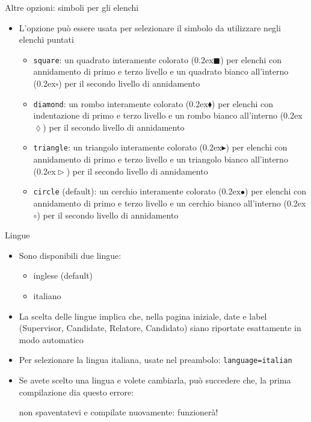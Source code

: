 \begin{frame}[t,fragile]{Altre opzioni: simboli per gli elenchi}
\begin{itemize}
\item L'opzione  può essere usata per selezionare il simbolo da utilizzare negli elenchi puntati
  \begin{itemize}
  \item \verb!square!: un quadrato interamente colorato
        ({\tiny\raise0.2ex\hbox{$\blacksquare$}}) per elenchi con annidamento di primo e terzo livello e un quadrato bianco all'interno
        ({\tiny\raise0.2ex\hbox{$\square$}}) per il secondo livello di annidamento
  \item \verb!diamond!: un rombo interamente colorato
        ({\tiny\raise0.2ex\hbox{$\blacklozenge$}}) per elenchi con indentazione di primo e terzo livello e un rombo bianco all'interno
        ({\tiny\raise0.2ex\hbox{$\lozenge$}}) per il secondo livello di annidamento
  \item \verb!triangle!: un triangolo interamente colorato
        ({\tiny\raise0.2ex\hbox{$\blacktriangleright$}}) per elenchi con annidamento di primo e terzo livello e un triangolo bianco all'interno
        ({\tiny\raise0.2ex\hbox{$\vartriangleright$}}) per il secondo livello di annidamento
  \item \verb!circle! (default): un cerchio interamente colorato
        ({\tiny\raise0.2ex\hbox{$\bullet$}}) per elenchi con annidamento di primo e terzo livello e un cerchio bianco all'interno
        ({\tiny\raise0.2ex\hbox{$\circ$}}) per il secondo livello di annidamento
  \end{itemize}
\end{itemize}
\end{frame}

\begin{frame}[t,fragile]{Lingue}
\begin{itemize}
\item Sono disponibili due lingue:
\begin{itemize}
\item inglese (default)
\item italiano
\end{itemize}
\item La scelta delle lingue implica che, nella pagina iniziale, date e label (Supervisor, Candidate, Relatore, Candidato) siano riportate esattamente in modo automatico
\item Per selezionare la lingua italiana, usate nel preambolo:
\verb!language=italian!
\item Se avete scelto una lingua e volete cambiarla, può succedere che, la prima compilazione dia questo errore: \begin{flushleft}
\end{flushleft}
non spaventatevi e compilate nuovamente: funzionerà!
\end{itemize}
\end{frame}

